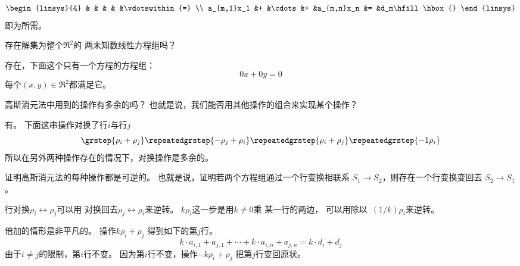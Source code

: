 \begin{exercises}
\begin{answer}
\begin{equation*}
\begin{linsys}{4}
                     &   &        &   &            &\vdotswithin{=}   \\
         a_{m,1}x_1  &+  &\cdots  &+  &a_{m,n}x_n  &=
              &d_m\hfill\hbox{}
       \end{linsys}
     \end{equation*}  
     即为所需。
   \end{answer}
  \item 
    存在解集为整个\( \Re^2 \)的
    两未知数线性方程组吗？
    \begin{answer}
      存在，下面这个只有一个方程的方程组：
      \begin{equation*}
         0x+0y=0
      \end{equation*}
      每个\( (x,y)\in\Re^2 \)都满足它。  
    \end{answer}
  \recommended \item 
    高斯消元法中用到的操作有多余的吗？
    也就是说，我们能否用其他操作的组合来实现某个操作？
    \begin{answer}
      有。
      下面这串操作对换了行\( i \)与行\( j \)
      \begin{equation*}
         \grstep{\rho_i+\rho_j}
         \repeatedgrstep{-\rho_j+\rho_i}
         \repeatedgrstep{\rho_i+\rho_j}
         \repeatedgrstep{-1\rho_i}
      \end{equation*}  
      所以在另外两种操作存在的情况下，对换操作是多余的。
     \end{answer}
  \item 
    证明高斯消元法的每种操作都是可逆的。
    也就是说，证明若两个方程组通过一个行变换相联系
    $S_1\rightarrow S_2$，则存在一个行变换变回去
    $S_2\rightarrow S_1$。
    \begin{answer}
      行对换$\rho_i\leftrightarrow\rho_j$可以用
      对换回去$\rho_j\leftrightarrow\rho_i$来逆转。
      $k\rho_i$这一步是用\( k\neq 0  \)乘
      某一行的两边，
      可以用除以~$(1/k)\rho_i$来逆转。

      倍加的情形是非平凡的。
      操作$k\rho_i+\rho_j$
      得到如下的第$j$行。
      \begin{equation*}
        k\cdot a_{i,1}+a_{j,1}+\cdots+k\cdot a_{i,n}+a_{j,n}=k\cdot d_i+d_j
      \end{equation*}
      由于$i\neq j$的限制，第$i$行不变。
      因为第$i$行不变，操作$-k\rho_i+\rho_j$
      把第$j$行变回原状。


\end{answer}
\end{exercises}
